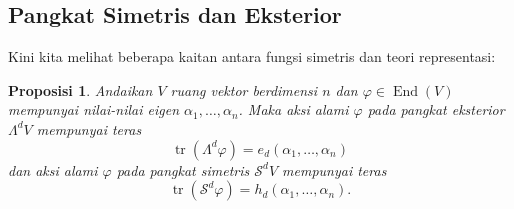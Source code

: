 \documentclass[12pt]{article}
\theoremstyle{plain}
\newtheorem{proposition}[theorem]{Proposisi}
\theoremstyle{definition}
\theoremstyle{remark}
\numberwithin{equation}{section}
\begin{document}
\subsection{Pangkat Simetris dan Eksterior}

Kini kita melihat beberapa kaitan antara fungsi simetris dan
teori representasi:
\begin{proposition}
Andaikan $V$ ruang vektor berdimensi $n$ dan
$\varphi \in \operatorname{End}(V)$ mempunyai nilai-nilai eigen
$\alpha_1,\ldots,\alpha_n$.
Maka aksi alami $\varphi$ pada pangkat eksterior $\Lambda^d V$
mempunyai teras
\[
\operatorname{tr}\left( \Lambda^d \varphi \right)
= e_d(\alpha_1,\ldots,\alpha_n)
\]
dan aksi alami $\varphi$ pada pangkat simetris
$\mathcal{S}^d V$ mempunyai teras
\[
\operatorname{tr}\left( \mathcal{S}^d \varphi \right)
= h_d(\alpha_1,\ldots,\alpha_n).
\]
\end{proposition}
\end{document}
